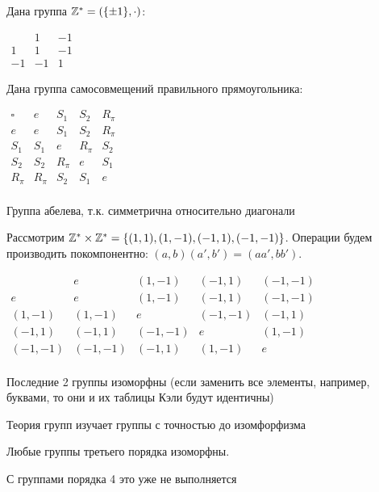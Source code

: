 \documentclass[main]{subfiles}
\begin{document}
Дана группа $\mathbb{Z}^* = (\{ \pm 1\}, \cdot)$:

\begin{center}
    $\begin{array}{c|cc}
               & 1  & -1 \\
            \hline
            1  & 1  & -1 \\
            -1 & -1 & 1
        \end{array}$
\end{center}

Дана группа самосовмещений правильного прямоугольника:
\begin{center}
    $\begin{array}{c|cccc}
            \square & e     & S_1   & S_2   & R_\pi \\
            \hline
            e       & e     & S_1   & S_2   & R_\pi \\
            S_1     & S_1   & e     & R_\pi & S_2   \\
            S_2     & S_2   & R_\pi & e     & S_1   \\
            R_\pi   & R_\pi & S_2   & S_1   & e     \\
        \end{array}$
\end{center}
Группа абелева, т.к. симметрична относительно диагонали

Рассмотрим $\mathbb{Z}^* \times \mathbb{Z}^* = \{(1,1), (1, -1), (-1,1), (-1,-1)\}$.
Операции будем производить покомпонентно: $(a,b)(a', b')= (aa', bb')$.
\begin{center}
    $\begin{array}{c|cccc}
                    & e       & (1, -1) & (-1,1)  & (-1,-1) \\
            \hline
            e       & e       & (1, -1) & (-1,1)  & (-1,-1) \\
            (1,-1)  & (1, -1) & e       & (-1,-1) & (-1,1)  \\
            (-1,1)  & (-1,1)  & (-1,-1) & e       & (1, -1) \\
            (-1,-1) & (-1,-1) & (-1,1)  & (1, -1) & e       \\
        \end{array}$
\end{center}

Последние 2 группы изоморфны (если заменить все элементы, например, буквами,
то они и их таблицы Кэли будут идентичны)

Теория групп изучает группы с точностью до изомфорфизма

\begin{axiom}
    Любые группы третьего порядка изоморфны.
\end{axiom}

С группами порядка 4 это уже не выполняется
\end{document}
